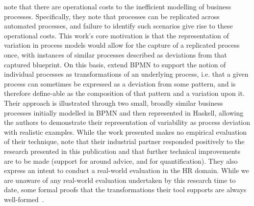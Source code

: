 

\citeauthor{Machado_2011} note that there are operational costs to the
inefficient modelling of business processes. Specifically, they note that
processes can be replicated across automated processes, and failure to identify
such scenarios give rise to these operational costs. This work's core motivation
is that the representation of variation in process models would allow for the
capture of a replicated process once, with instances of similar processes
described as deviations from that captured blueprint. On this basis,
\citeauthor{Machado_2011} extend BPMN to support the notion of individual
processes as transformations of an underlying process, i.e. that a given process
can sometimes be expressed as a deviation from some pattern, and is therefore
define-able as the composition of that pattern and a variation upon it. Their
approach is illustrated through two small, broadly similar business processes
initially modelled in BPMN and then represented in Haskell, allowing the authors
to demonstrate their representation of variability as process deviation with
realistic examples. While the work presented makes no empirical evaluation of
their technique, \citeauthor{Machado_2011} note that their industrial partner
responded positively to the research presented in this publication and that
further technical improvements are to be made (support for around advice, and
for quantification). They also express an intent to conduct a real-world
evaluation in the HR domain. While we are unaware of any real-world evaluation
undertaken by this research time to date, some formal proofs that the
transformations their tool supports are always well-formed~\cite{machado2012formal}.




